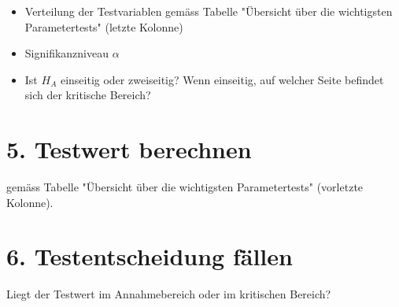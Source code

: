 \documentclass[10pt]{article}
\begin{document}
\begin{itemize}
  \item Verteilung der Testvariablen gemäss Tabelle "Übersicht über die wichtigsten Parametertests" (letzte Kolonne)
  \item Signifikanzniveau $\alpha$
  \item Ist $H_{A}$ einseitig oder zweiseitig? Wenn einseitig, auf welcher Seite befindet sich der kritische Bereich?
\end{itemize}

\section*{5. Testwert berechnen}
gemäss Tabelle "Übersicht über die wichtigsten Parametertests" (vorletzte Kolonne).

\section*{6. Testentscheidung fällen}
Liegt der Testwert im Annahmebereich oder im kritischen Bereich?
\end{document}
